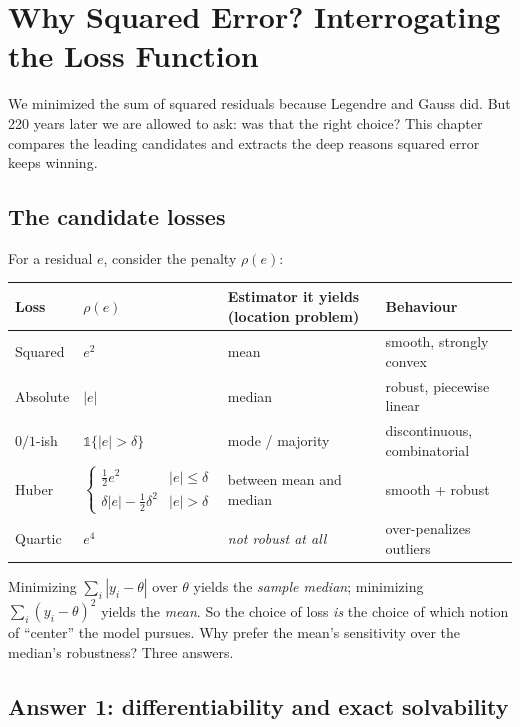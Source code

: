\section{Why Squared Error? Interrogating the Loss Function}\label{sec:why-squared}

We minimized the sum of squared residuals because Legendre and Gauss did. But 220 years later we are allowed to ask: was that the right choice? This chapter compares the leading candidates and extracts the deep reasons squared error keeps winning.

\subsection{The candidate losses}

For a residual $e$, consider the penalty $\rho(e)$:

\begin{center}
\begin{tabular}{@{}llll@{}}
\toprule
Loss & $\rho(e)$ & Estimator it yields (location problem) & Behaviour \\
\midrule
Squared & $e^2$ & mean & smooth, strongly convex \\
Absolute & $|e|$ & median & robust, piecewise linear \\
$0/1$-ish & $\mathbb{1}\{|e| > \delta\}$ & mode / majority & discontinuous, combinatorial \\
Huber & $\begin{cases} \frac{1}{2}e^2 & |e|\le\delta \\ \delta|e| - \frac{1}{2}\delta^2 & |e| > \delta\end{cases}$ & between mean and median & smooth + robust \\
Quartic & $e^4$ & \emph{not robust at all} & over-penalizes outliers \\
\bottomrule
\end{tabular}
\end{center}

Minimizing $\sum_i |y_i - \theta|$ over $\theta$ yields the \emph{sample median}; minimizing $\sum_i (y_i - \theta)^2$ yields the \emph{mean}. So the choice of loss \emph{is} the choice of which notion of ``center'' the model pursues. Why prefer the mean's sensitivity over the median's robustness? Three answers.

\subsection{Answer 1: differentiability and exact solvability}

